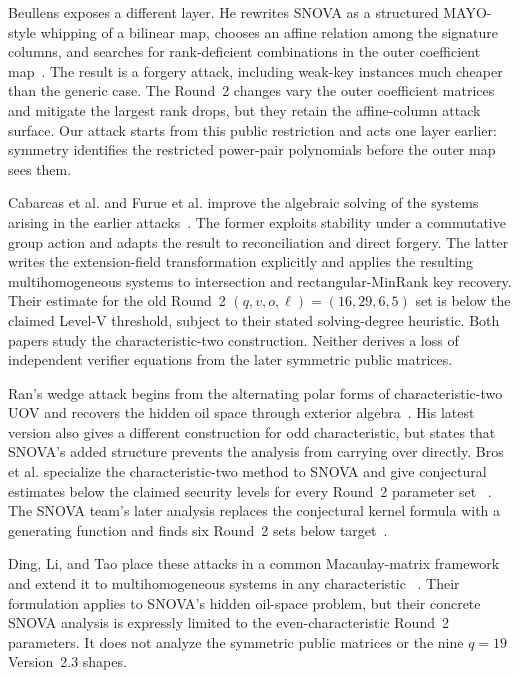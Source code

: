 \documentclass[11pt]{article}
\newcommand{\SNOVA}{\textsf{SNOVA}}
\begin{document}
Beullens exposes a different layer.  He rewrites \SNOVA{} as a structured
MAYO-style whipping of a bilinear map, chooses an affine relation among the
signature columns, and searches for rank-deficient combinations in the outer
coefficient map~\cite{Beullens2024SNOVA}.  The result is a forgery attack,
including weak-key instances much cheaper than the generic case.  The Round~2
changes vary the outer coefficient matrices and mitigate the largest rank
drops, but they retain the affine-column attack surface.  Our attack starts
from this public restriction and acts one layer earlier: symmetry identifies
the restricted power-pair polynomials before the outer map sees them.

Cabarcas et al. and Furue et al. improve the algebraic solving of the systems
arising in the earlier attacks~\cite{Cabarcas2025SNOVA,FurueEtAl2025}.  The
former exploits stability under a commutative group action and adapts the
result to reconciliation and direct forgery.  The latter writes the
extension-field transformation explicitly and applies the resulting
multihomogeneous systems to intersection and rectangular-MinRank key recovery.
Their estimate for the old Round~2 $(q,v,o,\ell)=(16,29,6,5)$ set is below the
claimed Level-V threshold, subject to their stated solving-degree heuristic.
Both papers study the characteristic-two construction.  Neither derives a
loss of independent verifier equations from the later symmetric public
matrices.

Ran's wedge attack begins from the alternating polar forms of
characteristic-two UOV and recovers the hidden oil space through exterior
algebra~\cite{Ran2026}.  His latest version also gives a different construction
for odd characteristic, but states that SNOVA's added structure prevents the
analysis from carrying over directly.  Bros et al. specialize the
characteristic-two method to \SNOVA{} and give conjectural estimates below the
claimed security levels for every Round~2 parameter set
~\cite{BrosEtAl2026SNOVAWedge}.  The \SNOVA{} team's later analysis replaces
the conjectural kernel formula with a generating function and finds six
Round~2 sets below target~\cite{TsengEtAl2026Wedge}.

Ding, Li, and Tao place these attacks in a common Macaulay-matrix framework and
extend it to multihomogeneous systems in any characteristic
~\cite{DingLiTao2026}.  Their formulation applies to SNOVA's hidden oil-space
problem, but their concrete SNOVA analysis is expressly limited to the
even-characteristic Round~2 parameters.  It does not analyze the symmetric
public matrices or the nine $q=19$ Version~2.3 shapes.
\end{document}

